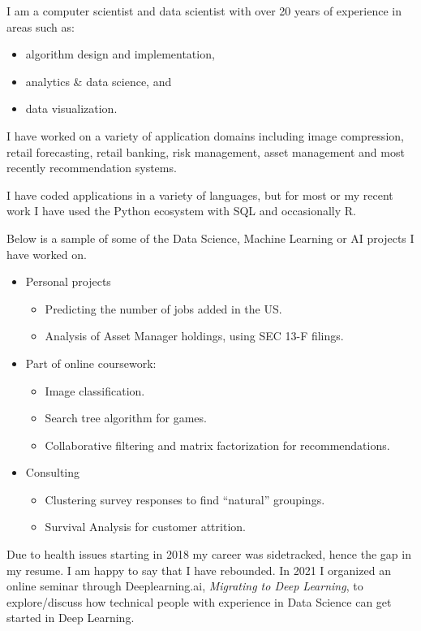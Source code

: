 \documentclass{article}
\begin{document}
\noindent
I am a computer scientist and data scientist with over 20 years of experience in areas such as:
\begin{itemize}[noitemsep]
 \item algorithm design and implementation,
 \item analytics \& data science, and
 \item data visualization.
\end{itemize}

I have worked on a variety of application domains including image compression, retail forecasting, retail banking, risk management, asset management and most recently recommendation systems.

I have coded applications in a variety of languages, but for most or my recent work I have used the Python ecosystem with SQL and occasionally R.
\vspace{0.1in}

Below is a sample of some of the Data Science, Machine Learning or AI projects I have worked on.
\begin{itemize}[noitemsep]
\itemsep0em
\item Personal projects
    \begin{itemize}
  \item  Predicting the number of jobs added in the US.
     \item Analysis of Asset Manager holdings, using SEC 13-F filings.
 \end{itemize}
 \item Part of online coursework:
    \begin{itemize}
       \item  Image classification.
       \item Search tree algorithm for games.
       \item Collaborative filtering and matrix factorization for recommendations.
\end{itemize}        
\item  Consulting
 \begin{itemize}
     \item Clustering survey responses to find “natural” groupings.
     \item Survival Analysis for customer attrition.   
  \end{itemize}       
\end{itemize}

\vspace{0.1in}
Due to health issues starting in 2018 my career was sidetracked, hence the gap in my resume.
I am happy to say that I have rebounded. In 2021 I organized an online seminar through Deeplearning.ai, \emph{Migrating to Deep Learning},
to explore/discuss how technical people with experience in Data Science can get started in Deep Learning.
\end{document}
